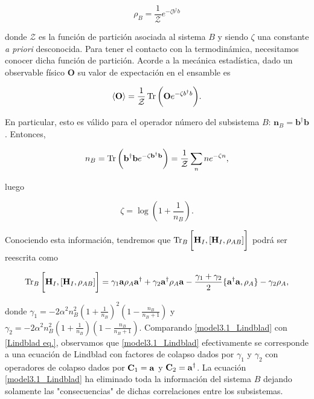 \documentclass{report} %
\newcommand{\lgg}{\langle}
\newcommand{\rgg}{\rangle}
\numberwithin{equation}{section}
\begin{document}
\begin{equation}
\rho_{B} = \frac{1}{\mathcal{Z}} e^{-\zeta b^{\dagger}b }
\label{model1_rhoB}
\end{equation}

donde $\mathcal{Z}$ es la función de partición asociada al sistema $B$ y siendo $\zeta$ una constante \textit{a priori} desconocida. Para tener el contacto con la termodinámica, necesitamos conocer dicha función de partición. Acorde a la mecánica estadística, dado un observable físico $\mathbf{O}$ su valor de expectación en el ensamble es 

\begin{equation}
    \lgg \mathbf{O} \rgg = \frac{1}{\mathcal{Z}}\Tr \bigg(\mathbf{O}e^{-\zeta b^{\dagger}b }\bigg).
\end{equation}

En particular, esto es válido para el operador número del subsistema $B$: $\mathbf{n}_B = {\mathbf b}^{\dagger}{\mathbf b}$. Entonces,

\begin{equation}
    n_B = \Tr\bigg({\mathbf b}^{\dagger}{\mathbf b}e^{-\zeta {\mathbf b}^{\dagger}{\mathbf b} }\bigg) = \frac{1}{\mathcal{Z}} \sum_{n} n e^{-\zeta n} ,
\end{equation}

luego

\begin{equation}
    \zeta = \log \left(1 + \frac{1}{n_B}\right).
\end{equation}

Conociendo esta información, tendremos que $\Tr_{B} \bigg[{\bf H}_{I},[{\bf H}_{I},\rho_{AB}]\bigg]$ podrá ser reescrita como

\begin{equation}
\Tr_{B} \bigg[{\bf H}_{I},[{\bf H}_{I},\rho_{AB}]\bigg] = \gamma_1 {\mathbf a}\rho_{A} {\mathbf a}^{\dagger} + \gamma_2 {\mathbf a}^{\dagger} \rho_{A}{\mathbf a} - \frac{\gamma_1 + \gamma_2}{2} \{{\mathbf a}^{\dagger}{\mathbf a},\rho_{A}\} - \gamma_2 \rho_{A},  
\label{model3.1_Lindblad}
\end{equation}

donde $\gamma_1 = -2\alpha^2n_B^2\left(1+\frac{1}{n_B}\right)^2\left(1-\frac{n_B}{n_B+1}\right)$ y $\gamma_2 = -2\alpha^2n_B^2\left(1+\frac{1}{n_B}\right)\left(1-\frac{n_B}{n_B+1}\right)$. Comparando \eqref{model3.1_Lindblad} con \eqref{Lindblad eq.}, observamos que \eqref{model3.1_Lindblad} efectivamente se corresponde a una ecuación de Lindblad con factores de colapso dados por $\gamma_1$ y $\gamma_2$ con operadores de colapso dados por ${\bf C}_1 = {\mathbf a}$ y ${\bf C}_2 = {\mathbf a}^{\dagger}$. La ecuación \eqref{model3.1_Lindblad} ha eliminado toda la información del sistema $B$ dejando solamente las "consecuencias" de dichas correlaciones entre los subsistemas.
\end{document}

